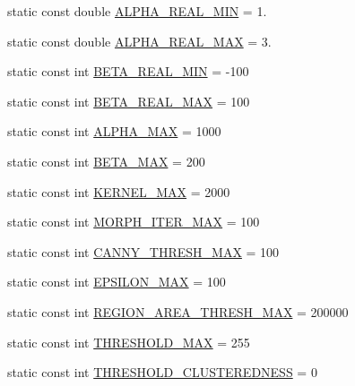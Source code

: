 \begin{DoxyCompactItemize}
\item 
static const double \hyperlink{classmultiscale_1_1analysis_1_1RegionDetector_a4a11aa86a5250ca6197589c4ccb770f6}{A\-L\-P\-H\-A\-\_\-\-R\-E\-A\-L\-\_\-\-M\-I\-N} = 1.
\item 
static const double \hyperlink{classmultiscale_1_1analysis_1_1RegionDetector_abc853d2cfef9e4fafbf86715b48495e0}{A\-L\-P\-H\-A\-\_\-\-R\-E\-A\-L\-\_\-\-M\-A\-X} = 3.
\item 
static const int \hyperlink{classmultiscale_1_1analysis_1_1RegionDetector_a87d07b8a993b50bcf050e4c206ac126c}{B\-E\-T\-A\-\_\-\-R\-E\-A\-L\-\_\-\-M\-I\-N} = -\/100
\item 
static const int \hyperlink{classmultiscale_1_1analysis_1_1RegionDetector_a19e9e6c3ea18fe9a3dbf7a1a02652985}{B\-E\-T\-A\-\_\-\-R\-E\-A\-L\-\_\-\-M\-A\-X} = 100
\item 
static const int \hyperlink{classmultiscale_1_1analysis_1_1RegionDetector_a7ca1e136dc9d768f1e11cd6f770d950f}{A\-L\-P\-H\-A\-\_\-\-M\-A\-X} = 1000
\item 
static const int \hyperlink{classmultiscale_1_1analysis_1_1RegionDetector_ad2c6485f637cae5abee0303b41df1480}{B\-E\-T\-A\-\_\-\-M\-A\-X} = 200
\item 
static const int \hyperlink{classmultiscale_1_1analysis_1_1RegionDetector_aa988e3458f774c489e03e3f8bd0db1ed}{K\-E\-R\-N\-E\-L\-\_\-\-M\-A\-X} = 2000
\item 
static const int \hyperlink{classmultiscale_1_1analysis_1_1RegionDetector_adeaa40a86b09bad2530bf179cbb4e602}{M\-O\-R\-P\-H\-\_\-\-I\-T\-E\-R\-\_\-\-M\-A\-X} = 100
\item 
static const int \hyperlink{classmultiscale_1_1analysis_1_1RegionDetector_ad6590f4617a6b3d34c6032f8febd7beb}{C\-A\-N\-N\-Y\-\_\-\-T\-H\-R\-E\-S\-H\-\_\-\-M\-A\-X} = 100
\item 
static const int \hyperlink{classmultiscale_1_1analysis_1_1RegionDetector_a724d57c0db65696f2ddab415deb1138d}{E\-P\-S\-I\-L\-O\-N\-\_\-\-M\-A\-X} = 100
\item 
static const int \hyperlink{classmultiscale_1_1analysis_1_1RegionDetector_a8a301bd841d376448aff4a0c4d0a1485}{R\-E\-G\-I\-O\-N\-\_\-\-A\-R\-E\-A\-\_\-\-T\-H\-R\-E\-S\-H\-\_\-\-M\-A\-X} = 200000
\item 
static const int \hyperlink{classmultiscale_1_1analysis_1_1RegionDetector_a53c6e2b067a8b8c82484cbca34cc3d57}{T\-H\-R\-E\-S\-H\-O\-L\-D\-\_\-\-M\-A\-X} = 255
\item 
static const int \hyperlink{classmultiscale_1_1analysis_1_1RegionDetector_a52778f49510e1e500b2dc48857724e20}{T\-H\-R\-E\-S\-H\-O\-L\-D\-\_\-\-C\-L\-U\-S\-T\-E\-R\-E\-D\-N\-E\-S\-S} = 0

\end{DoxyCompactItemize}
